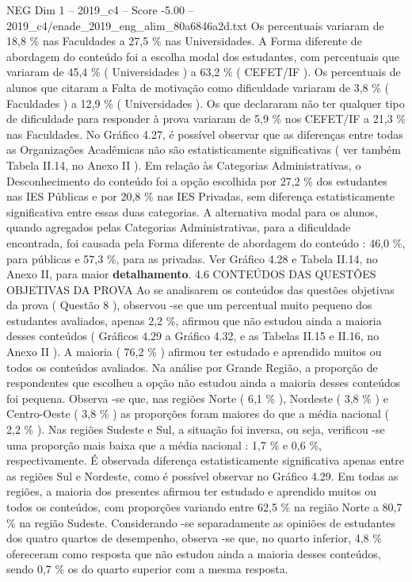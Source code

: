 \begin{textsample}{NEG Dim 1 – 2019\_c4 – Score -5.00 – 2019\_c4/enade\_2019\_eng\_alim\_80a6846a2d.txt}
Os percentuais variaram de 18,8 \% nas Faculdades a 27,5 \% nas Universidades.
A Forma diferente de abordagem do conteúdo foi a escolha modal dos estudantes, com percentuais que variaram de 45,4 \% ( Universidades ) a 63,2 \% ( CEFET/IF ).
Os percentuais de alunos que citaram a Falta de motivação como dificuldade variaram de 3,8 \% ( Faculdades ) a 12,9 \% ( Universidades ).
Os que declararam não ter qualquer tipo de dificuldade para responder à prova variaram de 5,9 \% nos CEFET/IF a 21,3 \% nas Faculdades.
No Gráfico 4.27, é possível observar que as diferenças entre todas as Organizações Acadêmicas não são estatisticamente significativas ( ver também Tabela II.14, no Anexo II ).
Em relação às Categorias Administrativas, o Desconhecimento do conteúdo foi a opção escolhida por 27,2 \% dos estudantes nas IES Públicas e por 20,8 \% nas IES Privadas, sem diferença estatisticamente significativa entre essas duas categorias.
A alternativa modal para os alunos, quando agregados pelas Categorias Administrativas, para a dificuldade encontrada, foi causada pela Forma diferente de abordagem do conteúdo : 46,0 \%, para públicas e 57,3 \%, para as privadas.
Ver Gráfico 4.28 e Tabela II.14, no Anexo II, para maior \textbf{detalhamento}. 4.6 CONTEÚDOS DAS QUESTÕES OBJETIVAS DA PROVA Ao se analisarem os conteúdos das questões objetivas da prova ( Questão 8 ), observou -se que um percentual muito pequeno dos estudantes avaliados, apenas 2,2 \%, afirmou que não estudou ainda a maioria desses conteúdos ( Gráficos 4.29 a Gráfico 4.32, e as Tabelas II.15 e II.16, no Anexo II ).
A maioria ( 76,2 \% ) afirmou ter estudado e aprendido muitos ou todos os conteúdos avaliados.
Na análise por Grande Região, a proporção de respondentes que escolheu a opção não estudou ainda a maioria desses conteúdos foi pequena.
Observa -se que, nas regiões Norte ( 6,1 \% ), Nordeste ( 3,8 \% ) e Centro-Oeste ( 3,8 \% ) as proporções foram maiores do que a média nacional ( 2,2 \% ).
Nas regiões Sudeste e Sul, a situação foi inversa, ou seja, verificou -se uma proporção mais baixa que a média nacional : 1,7 \% e 0,6 \%, respectivamente.
É observada diferença estatisticamente significativa apenas entre as regiões Sul e Nordeste, como é possível observar no Gráfico 4.29.
Em todas as regiões, a maioria dos presentes afirmou ter estudado e aprendido muitos ou todos os conteúdos, com proporções variando entre 62,5 \% na região Norte a 80,7 \% na região Sudeste.
Considerando -se separadamente as opiniões de estudantes dos quatro quartos de desempenho, observa -se que, no quarto inferior, 4,8 \% ofereceram como resposta que não estudou ainda a maioria desses conteúdos, sendo 0,7 \% os do quarto superior com a mesma resposta.

\end{textsample}
